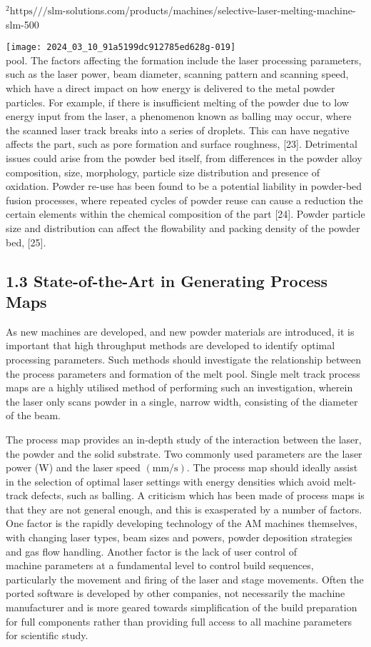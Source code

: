 \documentclass[10pt]{article}
\begin{document}
${ }^{2} \mathrm{https} / / / \mathrm{slm}$-solutions.com/products/machines/selective-laser-melting-machine-slm-500

\texttt{[image: 2024\_03\_10\_91a5199dc912785ed628g-019]}\\
pool. The factors affecting the formation include the laser processing parameters, such as the laser power, beam diameter, scanning pattern and scanning speed, which have a direct impact on how energy is delivered to the metal powder particles. For example, if there is insufficient melting of the powder due to low energy input from the laser, a phenomenon known as balling may occur, where the scanned laser track breaks into a series of droplets. This can have negative affects the part, such as pore formation and surface roughness, [23]. Detrimental issues could arise from the powder bed itself, from differences in the powder alloy composition, size, morphology, particle size distribution and presence of oxidation. Powder re-use has been found to be a potential liability in powder-bed fusion processes, where repeated cycles of powder reuse can cause a reduction the certain elements within the chemical composition of the part [24]. Powder particle size and distribution can affect the flowability and packing density of the powder bed, [25].

\subsection*{1.3 State-of-the-Art in Generating Process Maps}
As new machines are developed, and new powder materials are introduced, it is important that high throughput methods are developed to identify optimal processing parameters. Such methods should investigate the relationship between the process parameters and formation of the melt pool. Single melt track process maps are a highly utilised method of performing such an investigation, wherein the laser only scans powder in a single, narrow width, consisting of the diameter of the beam.

The process map provides an in-depth study of the interaction between the laser, the powder and the solid substrate. Two commonly used parameters are the laser power (W) and the laser speed $(\mathrm{mm} / \mathrm{s})$. The process map should ideally assist in the selection of optimal laser settings with energy densities which avoid melt-track defects, such as balling. A criticism which has been made of process maps is that they are not general enough, and this is exasperated by a number of factors. One factor is the rapidly developing technology of the AM machines themselves, with changing laser types, beam sizes and powers, powder deposition strategies and gas flow handling. Another factor is the lack of user control of\\
machine parameters at a fundamental level to control build sequences, particularly the movement and firing of the laser and stage movements. Often the ported software is developed by other companies, not necessarily the machine manufacturer and is more geared towards simplification of the build preparation for full components rather than providing full access to all machine parameters for scientific study.
\end{document}
